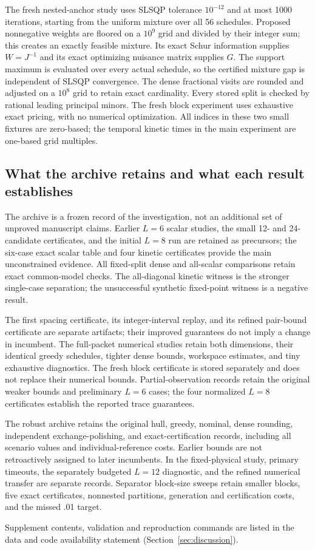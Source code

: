The fresh nested-anchor study uses SLSQP tolerance $10^{-12}$ and at most
1000 iterations, starting from the uniform mixture over all 56 schedules.
Proposed nonnegative weights are floored on a $10^9$ grid and divided by their
integer sum; this creates an exactly feasible mixture. Its exact Schur
information supplies $W=J^{-1}$ and its exact optimizing nuisance matrix
supplies $G$. The support maximum is evaluated over every actual schedule,
so the certified mixture gap is independent of SLSQP convergence. The dense
fractional visits are rounded and adjusted on a $10^8$ grid to retain exact
cardinality. Every stored split is checked by rational leading principal
minors. The fresh block experiment uses exhaustive exact pricing, with no
numerical optimization. All indices in these two small fixtures are zero-based;
the temporal kinetic times in the main experiment are one-based grid multiples.

\subsection{What the archive retains and what each result establishes}

The archive is a frozen record of the investigation, not an additional
set of unproved manuscript claims. Earlier $L=6$ scalar studies, the small
12- and 24-candidate certificates, and the initial $L=8$ run are retained as
precursors; the six-case exact scalar table and four kinetic certificates
provide the main unconstrained evidence. All fixed-split dense and all-scalar
comparisons retain exact common-model checks. The all-diagonal kinetic witness
is the stronger single-case separation; the unsuccessful synthetic
fixed-point witness is a negative result.

The first spacing certificate, its integer-interval replay, and its refined
pair-bound certificate are separate artifacts; their improved guarantees do
not imply a change in incumbent. The full-packet numerical studies retain
both dimensions, their identical greedy schedules, tighter dense bounds,
workspace estimates, and tiny exhaustive diagnostics. The fresh block
certificate is stored separately and does not replace their numerical bounds.
Partial-observation records retain the original weaker bounds and preliminary
$L=6$ cases; the four normalized $L=8$ certificates establish the reported
trace guarantees.

The robust archive retains the original hull, greedy, nominal, dense rounding,
independent exchange-polishing, and exact-certification records, including all
scenario values and individual-reference costs. Earlier bounds are not
retroactively assigned to later incumbents. In the fixed-physical study,
primary timeouts, the separately budgeted $L=12$ diagnostic, and the refined
numerical transfer are separate records. Separator block-size sweeps retain
smaller blocks, five exact certificates, nonnested partitions, generation and
certification costs, and the missed .01 target.

Supplement contents, validation and reproduction commands are listed in the
data and code availability statement (Section~\ref{sec:discussion}).
